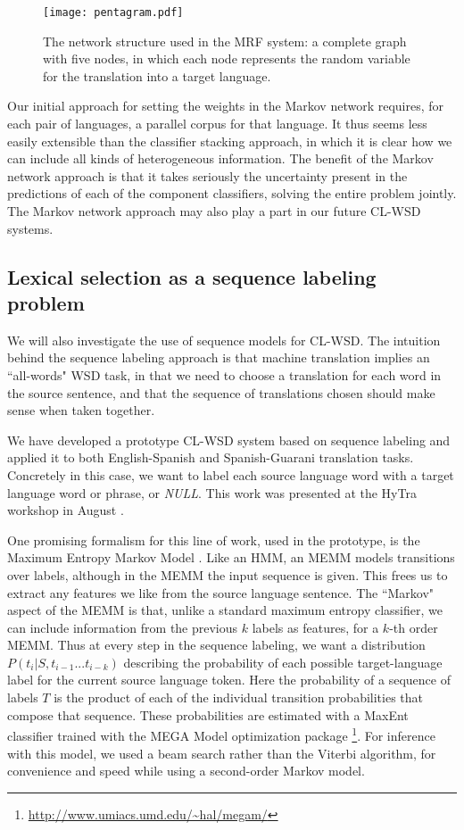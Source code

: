\begin{figure}
  \begin{center}
  \texttt{[image: pentagram.pdf]}
  \end{center}
  \caption{The network structure used in the MRF system: a complete graph with
  five nodes, in which each node represents the random variable for the
  translation into a target language.}
  \label{fig:pentagram}
\end{figure}

Our initial approach for setting the weights in the Markov network requires,
for each pair of languages, a parallel corpus for that language. It thus seems
less easily extensible than the classifier stacking approach, in which it is
clear how we can include all kinds of heterogeneous information.
The benefit of the Markov network approach is that it takes seriously the
uncertainty present in the predictions of each of the component classifiers,
solving the entire problem jointly.
The Markov network approach may also play a part in our future CL-WSD systems.

\subsection{Lexical selection as a sequence labeling problem}
We will also investigate the use of sequence models for CL-WSD.
The intuition behind the sequence labeling approach is that machine translation
implies an ``all-words" WSD task, in that we need to choose a translation for
each word in the source sentence, and that the sequence of translations chosen
should make sense when taken together.

We have developed a prototype CL-WSD system based on sequence labeling and
applied it to both English-Spanish and Spanish-Guarani translation tasks.
Concretely in this case, we want to label each source language word with a
target language word or phrase, or \emph{NULL}.
This work was presented at the HyTra workshop in August
\cite{rudnick-gasser:2013:HyTra-2013}.

One promising formalism for this line of work, used in the prototype, is the
Maximum Entropy Markov Model \cite{icml00/mccallum}.
Like an HMM, an MEMM models transitions over labels, although in the MEMM the
input sequence is given.
This frees us to extract any features we like from the source language
sentence. The ``Markov" aspect of the MEMM is that, unlike a standard maximum
entropy classifier, we can include information from the previous $k$ labels as
features, for a $k$-th order MEMM.
Thus at every step in the sequence labeling, we want a distribution
$P(t_i | S, t_{i-1}...t_{i-k})$ describing the probability of each possible
target-language label for the current source language token.
Here the probability of a sequence of labels $T$ is the product of each of the
individual transition probabilities that compose that sequence.
These probabilities are estimated with a MaxEnt classifier trained with 
the MEGA Model optimization package
\footnote{\url{http://www.umiacs.umd.edu/~hal/megam/}}.
For inference with this model, we used a beam search rather than the Viterbi
algorithm, for convenience and speed while using a second-order Markov model.

